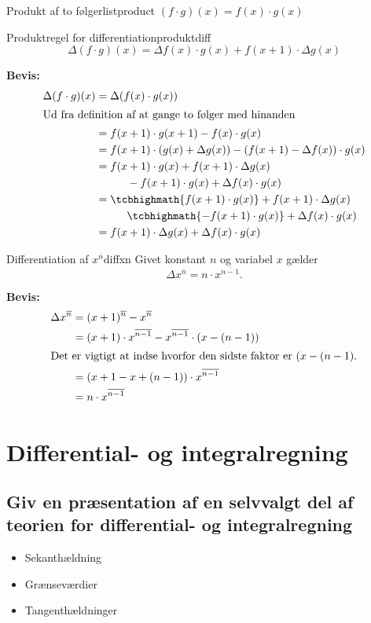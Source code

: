 \documentclass{article}
\begin{document}
\begin{definition}{Produkt af to følger}{listproduct}
	$ (f \cdot g)(x) = f(x) \cdot g(x) $ 
\end{definition}

\begin{theorem}{Produktregel for differentiation}{produktdiff}
	\[
		\Delta (f \cdot g)(x) = \Delta f(x) \cdot g(x) + f(x + 1) \cdot \Delta g(x)
	\] 
\end{theorem}
\textbf{Bevis:}
\begin{align*}
	\Delta (f \cdot g)(x) &= \Delta (f(x) \cdot g(x))\\
	\intertext{Ud fra definition af at gange to følger med hinanden}
						  &= f(x + 1) \cdot g(x + 1) - f(x) \cdot g(x)\\
						  &= f(x + 1) \cdot (g(x) + \Delta g(x)) - (f(x + 1) - \Delta f(x)) \cdot g(x)\\
						  &= f(x + 1) \cdot g(x) + f(x + 1) \cdot \Delta g(x) \\
						  &\gap- f(x + 1) \cdot g(x) + \Delta f(x) \cdot g(x)\\
						  &= \tcbhighmath{f(x + 1) \cdot g(x)} + f(x + 1) \cdot \Delta g(x) \\
						  &\gap\tcbhighmath{- f(x + 1) \cdot g(x)} + \Delta f(x) \cdot g(x)\\
						  &= f(x + 1) \cdot \Delta g(x) + \Delta f(x) \cdot g(x)
\end{align*}

\begin{theorem}{Differentiation af $x^{\overline{n}}$}{diffxn}
	Givet konstant $n$ og variabel $x$ gælder
	\[
		\Delta x^{\overline{n}} = n \cdot x^{\overline{n-1}}.
	\]
\end{theorem}
\textbf{Bevis:}
\begin{align*}
	\Delta x^{\overline{n}} &= (x+1)^{\overline{n}} - x^{\overline{n}}\\
	&= (x+1) \cdot x^{\overline{n-1}} - x^{\overline{n-1}} \cdot (x - (n-1))\\
\intertext{Det er vigtigt at indse hvorfor den sidste faktor er $(x - (n-1)$.}
	&= (x + 1 - x + (n - 1)) \cdot x^{\overline{n-1}}\\
	&= n \cdot x^{\overline{n-1}}
\end{align*}

\section{Differential- og integralregning}
\subsection{Giv en præsentation af en selvvalgt del af teorien for 
differential- og integralregning}
\begin{itemize}
	\item Sekanthældning
	\item Grænseværdier
	\item Tangenthældninger
\end{itemize}
\end{document}
